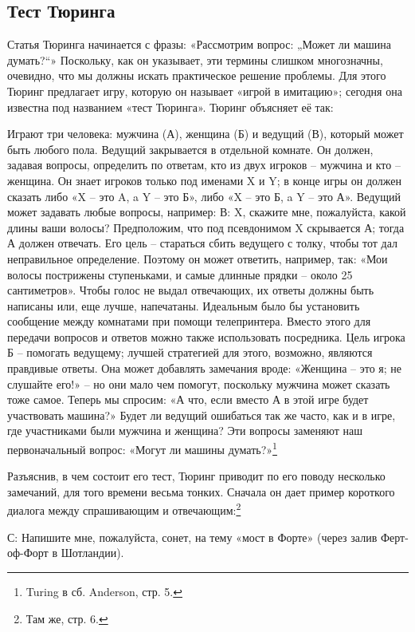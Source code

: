 \documentclass[../main.tex]{subfiles}
\begin{document}
\subsection{Тест Тюринга}

Статья Тюринга начинается с фразы: «Рассмотрим вопрос: „Может ли машина думать?{}``» Поскольку, как он указывает, эти термины слишком многозначны, очевидно, что мы должны искать практическое решение проблемы. Для этого Тюринг предлагает игру, которую он называет «игрой в имитацию»; сегодня она известна под названием «тест Тюринга». Тюринг объясняет её так:

Играют три человека: мужчина (А), женщина (Б) и ведущий (В), который может быть любого пола. Ведущий закрывается в отдельной комнате. Он должен, задавая вопросы, определить по ответам, кто из двух игроков \--- мужчина и кто \--- женщина. Он знает игроков только под именами X и Y; в конце игры он должен сказать либо «X \--- это A, a Y \--- это Б», либо «X \--- это Б, a Y \--- это А». Ведущий может задавать любые вопросы, например: В: X, скажите мне, пожалуйста, какой длины ваши волосы? Предположим, что под псевдонимом X скрывается А; тогда А должен отвечать. Его цель \--- стараться сбить ведущего с толку, чтобы тот дал неправильное определение. Поэтому он может ответить, например, так: «Мои волосы пострижены ступеньками, и самые длинные прядки \--- около 25 сантиметров». Чтобы голос не выдал отвечающих, их ответы должны быть написаны или, еще лучше, напечатаны. Идеальным было бы установить сообщение между комнатами при помощи телепринтера. Вместо этого для передачи вопросов и ответов можно также использовать посредника. Цель игрока Б \--- помогать ведущему; лучшей стратегией для этого, возможно, являются правдивые ответы. Она может добавлять замечания вроде: «Женщина \--- это я; не слушайте его!» \--- но они мало чем помогут, поскольку мужчина может сказать тоже самое. Теперь мы спросим: «А что, если вместо А в этой игре будет участвовать машина?» Будет ли ведущий ошибаться так же часто, как и в игре, где участниками были мужчина и женщина? Эти вопросы заменяют наш первоначальный вопрос: «Могут ли машины думать?»\footnote{Turing в сб. Anderson, стр. 5.}

Разъяснив, в чем состоит его тест, Тюринг приводит по его поводу несколько замечаний, для того времени весьма тонких. Сначала он дает пример короткого диалога между спрашивающим и отвечающим:\footnote{Там же, стр. 6.}

С: Напишите мне, пожалуйста, сонет, на тему «мост в Форте» (через залив Ферт-оф-Форт в Шотландии).
\end{document}
